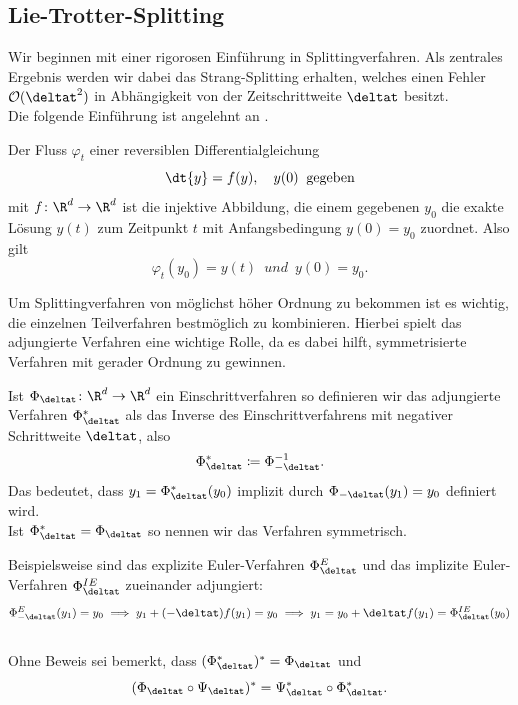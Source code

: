 \subsection{Lie-Trotter-Splitting}
\label{seclietrotter}
Wir beginnen mit einer rigorosen Einführung in Splittingverfahren. Als zentrales Ergebnis werden wir dabei das Strang-Splitting erhalten, welches einen Fehler $\mathcal{O}(\deltat^2)$ in Abhängigkeit von der Zeitschrittweite $\deltat$ besitzt.\\
Die folgende Einführung ist angelehnt an \autocite[Kapitel II.3 bis II.5]{HairerLubichWanner}.
\begin{mathdef}
Der Fluss $\varphi_t$ einer reversiblen Differentialgleichung
\begin{equation}
\label{orddgl}
\dt{y}=f(y),\quad y(0)\:\text{ gegeben}
\end{equation}
mit $f\colon \R^d\to\R^d$ ist die injektive Abbildung, die einem gegebenen $y_0$ die exakte Lösung $y(t)$ zum Zeitpunkt $t$ mit Anfangsbedingung $y(0)=y_0$ zuordnet. Also gilt
\begin{equation*}
\varphi_t(y_0)=y(t)\enspace und\enspace y(0)=y_0.
\end{equation*}
\end{mathdef}

Um Splittingverfahren von möglichst höher Ordnung zu bekommen ist es wichtig, die einzelnen Teilverfahren bestmöglich zu kombinieren. Hierbei spielt das adjungierte Verfahren eine wichtige Rolle, da es dabei hilft, symmetrisierte Verfahren mit gerader Ordnung zu gewinnen.
\begin{mathdef}
Ist $\Phi_{\deltat}\colon\R^d\to\R^d$ ein Einschrittverfahren so definieren wir das adjungierte Verfahren $\Phi_{\deltat}^*$ als das Inverse des Einschrittverfahrens mit negativer Schrittweite $\deltat$, also \[\Phi_{\deltat}^*\coloneqq\Phi_{-\deltat}^{-1}.\]
Das bedeutet, dass $y_1=\Phi_{\deltat}^*(y_0)$ implizit durch $\Phi_{-\deltat}(y_1)=y_0$ definiert wird.\\
Ist $\Phi_{\deltat}^*=\Phi_{\deltat}$ so nennen wir das Verfahren symmetrisch.
\end{mathdef}
Beispielsweise sind das explizite Euler-Verfahren $\Phi_{\deltat}^E$ und das implizite Euler-Verfahren $\Phi_{\deltat}^{IE}$ zueinander adjungiert: 
\[\Phi_{-\deltat}^E(y_1)=y_0\implies y_1+(-\deltat)f(y_1)=y_0\implies y_1=y_0+\deltat f(y_1)=\Phi_{\deltat}^{IE}(y_0)\] \\
Ohne Beweis sei bemerkt, dass $(\Phi_{\deltat}^*)^*=\Phi_{\deltat}$ und 
\begin{equation}
\label{adjlemma}
(\Phi_{\deltat}\circ \Psi_{\deltat})^*=\Psi_{\deltat}^* \circ \Phi_{\deltat}^*.
\end{equation}

